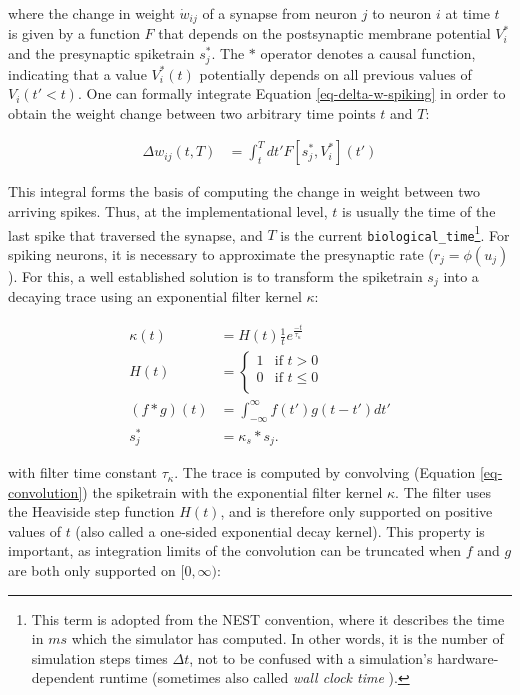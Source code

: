 where the change in weight $\dot{w}_{ij}$ of a synapse from neuron $j$ to neuron $i$ at time $t$ is given by a function
$F$ that depends on the postsynaptic membrane potential $V_i^\ast$ and the presynaptic spiketrain $s_j^\ast$. The $\ast$
operator denotes a causal function, indicating that a value $V_i^\ast(t)$ potentially depends on all previous values of
$V_i(t' < t)$. One can formally integrate Equation \ref{eq-delta-w-spiking} in order to obtain the weight change between
two arbitrary time points $t$ and $T$:

\begin{align}
  \Delta w_{ij}(t,T) & = \int_t^T dt' F[s_j^\ast, V_i^\ast](t') \label{eq-delta-w-t-T}
\end{align}

This integral forms the basis of computing the change in weight between two arriving spikes. Thus, at the
implementational level, $t$ is usually the time of the last spike that traversed the synapse, and $T$ is the current
\texttt{biological\_time}\footnote{This term is adopted from the NEST convention, where it describes the time in $ms$
  which the simulator has computed. In other words, it is the number of simulation steps times $\Delta t$, not to be
  confused with a simulation's hardware-dependent runtime (sometimes also called \textit{wall clock time}
  \citep{albada2018performance}). }. For spiking neurons, it is necessary to approximate the presynaptic rate
($r_j=\phi(u_j)$). For this, a well established solution is to transform the spiketrain $s_j$ into a decaying trace
using an exponential filter kernel $\kappa$:

\begin{align}
  \kappa(t)     & = H(t) \frac{1}{t}e^{\frac{-t}{\tau_{\kappa}}}                        \\
  H(t)          & =
  \begin{cases}
    1 & \text{if $t > 0$}    \\
    0 & \text{if $t \leq 0$} \\
  \end{cases}                                                              \\
  (f \ast g)(t) & = \int_{- \infty }^{\infty} f(t') g(t-t') d t' \label{eq-convolution} \\
  s_j^\ast      & = \kappa_s \ast s_j. \label{eq-spike-trace}
\end{align}

with filter time constant $\tau_\kappa$. The trace is computed by convolving (Equation \ref{eq-convolution}) the
spiketrain with the exponential filter kernel $\kappa$. The filter uses the Heaviside step function $H(t)$, and is
therefore only supported on positive values of $t$ (also called a one-sided exponential decay kernel). This property is
important, as integration limits of the convolution can be truncated when $f$ and $g$ are both only supported on
$[0,\infty)$:

